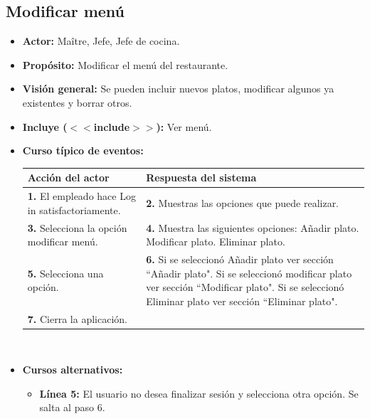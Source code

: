 \documentclass[spanish,a4paper,11pt, twoside]{report}	%
\begin{document}
		\subsection{Modificar menú}
			\begin{itemize}
			\item \textbf{Actor:} Maître, Jefe, Jefe de cocina.
			\item \textbf{Propósito:} Modificar el menú del restaurante.
			\item \textbf{Visión general:} Se pueden incluir nuevos platos, modificar algunos ya existentes y borrar otros.
			\item \textbf{Incluye ($<<$include$>>$):} Ver menú.
			\item \textbf{Curso típico de eventos:} 	\\
				\begin{tabular}{|p{6cm}||p{6cm}|}
				\hline
				\textbf{Acción del actor} & \textbf{Respuesta del sistema} \\ \hline \hline
				\textbf{1.}    El empleado hace Log in satisfactoriamente. & \textbf{2.} Muestras las opciones que puede realizar. \\ \hline
				\textbf{3.} Selecciona la opción modificar menú. & \textbf{4.} Muestra las siguientes opciones: Añadir plato. Modificar plato. Eliminar plato. \\ \hline
				\textbf{5.} Selecciona una opción.	& \textbf{6.} Si se seleccionó Añadir plato ver sección “Añadir plato". Si se seleccionó modificar plato ver sección “Modificar plato". Si se seleccionó Eliminar plato ver sección “Eliminar plato". \\ \hline
				\textbf{7.} Cierra la aplicación. &  \\ \hline
			\end{tabular}
			\\
			\item \textbf{Cursos alternativos:} 
			\begin{itemize}
			\item  \textbf{Línea 5:} El usuario no desea finalizar sesión y selecciona otra opción. Se salta al paso 6.
			\end {itemize}
			

\end{itemize}
\end{document}
